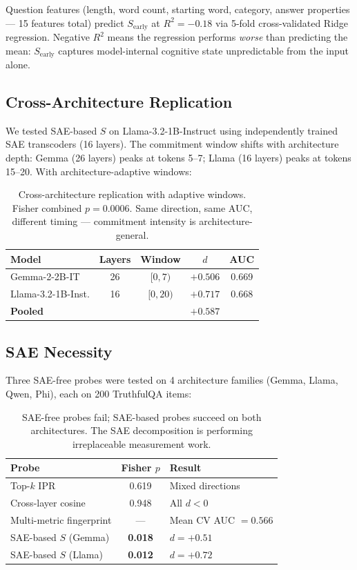 \documentclass{article}
\begin{document}
Question features (length, word count, starting word, category,
answer properties --- 15 features total) predict $S_\text{early}$ at
$R^2 = -0.18$ via 5-fold cross-validated Ridge regression. Negative
$R^2$ means the regression performs \textit{worse} than predicting
the mean: $S_\text{early}$ captures model-internal cognitive state
unpredictable from the input alone.

\subsection{Cross-Architecture Replication}

We tested SAE-based $S$ on Llama-3.2-1B-Instruct using independently
trained SAE transcoders (16 layers). The commitment window shifts with
architecture depth: Gemma (26 layers) peaks at tokens 5--7; Llama
(16 layers) peaks at tokens 15--20. With architecture-adaptive windows:

\begin{table}[h]
\centering
\small
\begin{tabular}{lcccc}
\toprule
Model & Layers & Window & $d$ & AUC \\
\midrule
Gemma-2-2B-IT & 26 & $[0, 7)$ & $+0.506$ & 0.669 \\
Llama-3.2-1B-Inst. & 16 & $[0, 20)$ & $+0.717$ & 0.668 \\
\midrule
\textbf{Pooled} & & & $+0.587$ & \\
\bottomrule
\end{tabular}
\caption{Cross-architecture replication with adaptive windows.
Fisher combined $p = 0.0006$. Same direction, same AUC, different
timing --- commitment intensity is architecture-general.}
\label{tab:crossarch}
\end{table}

\subsection{SAE Necessity}

Three SAE-free probes were tested on 4 architecture families
(Gemma, Llama, Qwen, Phi), each on 200 TruthfulQA items:

\begin{table}[h]
\centering
\small
\begin{tabular}{lcl}
\toprule
Probe & Fisher $p$ & Result \\
\midrule
Top-$k$ IPR & 0.619 & Mixed directions \\
Cross-layer cosine & 0.948 & All $d < 0$ \\
Multi-metric fingerprint & --- & Mean CV AUC $= 0.566$ \\
\midrule
SAE-based $S$ (Gemma) & \textbf{0.018} & $d = +0.51$ \\
SAE-based $S$ (Llama) & \textbf{0.012} & $d = +0.72$ \\
\bottomrule
\end{tabular}
\caption{SAE-free probes fail; SAE-based probes succeed on both
architectures. The SAE decomposition is performing irreplaceable
measurement work.}
\label{tab:saenecessity}
\end{table}
\end{document}
